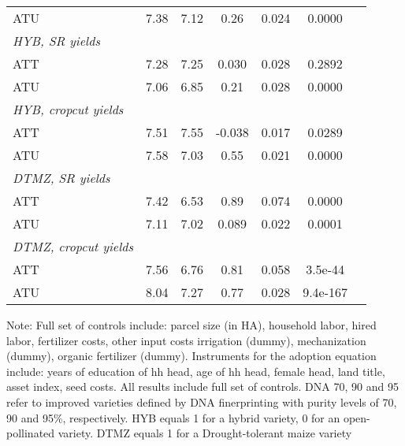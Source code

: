 \begin{table}[H]
\begin{threeparttable}
\begin{tabular}{l cccccc}
%
%
%
ATU         &        7.38&        7.12&        0.26&       0.024&      0.0000\\
%
%
%
\textit{HYB, SR yields}&            &            &            &            &            \\
ATT         &        7.28&        7.25&       0.030&       0.028&      0.2892\\
%
%
%
ATU         &        7.06&        6.85&        0.21&       0.028&      0.0000\\
%
%
%
\textit{HYB, cropcut yields}&            &            &            &            &            \\
ATT         &        7.51&        7.55&      -0.038&       0.017&      0.0289\\
%
%
%
ATU         &        7.58&        7.03&        0.55&       0.021&      0.0000\\
%
%
%
\textit{DTMZ, SR yields}&            &            &            &            &            \\
ATT         &        7.42&        6.53&        0.89&       0.074&      0.0000\\
%
%
%
ATU         &        7.11&        7.02&       0.089&       0.022&      0.0001\\
%
%
%
\textit{DTMZ, cropcut yields}&            &            &            &            &            \\
ATT         &        7.56&        6.76&        0.81&       0.058&     3.5e-44\\
%
%
%
ATU         &        8.04&        7.27&        0.77&       0.028&    9.4e-167\\
\hline
\hline
\end{tabular}
\begin{tablenotes}
\footnotesize
\item{Note: Full set of controls include: parcel size (in HA), household labor, hired labor, fertilizer costs, other input costs irrigation (dummy), mechanization (dummy), organic fertilizer (dummy). Instruments for the adoption equation include: years of education of hh head, age of hh head, female head, land title, asset index, seed costs. All results include full set of controls. DNA 70, 90 and 95 refer to improved varieties defined by DNA finerprinting with purity levels of 70, 90 and 95\%, respectively. HYB equals 1 for a hybrid variety, 0 for an open-pollinated variety. DTMZ equals 1 for a Drought-tolerant maize variety}
\end{tablenotes}
\end{threeparttable}
\end{table}
